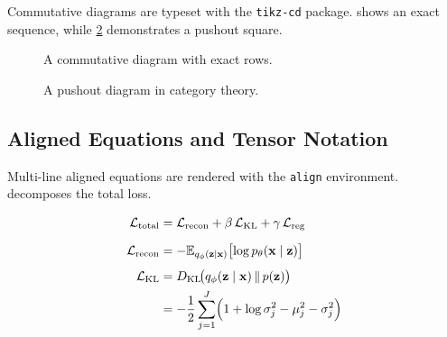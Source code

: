 \documentclass[
    language=english,
    doctype=article,
    institution=none,
    titlestyle=book,
]{../../omnilatex}
\theoremstyle{definition}
\theoremstyle{definition}
\theoremstyle{remark}
\newcommand{\mat}[1]{\mathbf{#1}}
\begin{document}
Commutative diagrams are typeset with the \texttt{tikz-cd} package.
 shows an exact sequence, while \cref{fig:cd-pushout}
demonstrates a pushout square.

\begin{figure}[htbp]
    \centering
    \caption{A commutative diagram with exact rows.}
    \label{fig:cd-exact}
\end{figure}

\begin{figure}[htbp]
    \centering
    \caption{A pushout diagram in category theory.}
    \label{fig:cd-pushout}
\end{figure}


\subsection{Aligned Equations and Tensor Notation}
\label{sec:aligned}

Multi-line aligned equations are rendered with the \texttt{align} environment.
 decomposes the total loss.

\begin{align}
    \label{eq:loss-decompose}
    \mathcal{L}_{\text{total}}
        &= \mathcal{L}_{\text{recon}} + \beta\, \mathcal{L}_{\text{KL}}
           + \gamma\, \mathcal{L}_{\text{reg}} \\[6pt]
    \mathcal{L}_{\text{recon}}
        &= -\mathbb{E}_{q_\phi(\mat{z} \mid \mat{x})}
           \bigl[\log p_\theta(\mat{x} \mid \mat{z})\bigr] \\[4pt]
    \mathcal{L}_{\text{KL}}
        &= D_{\mathrm{KL}}\!\bigl(
            q_\phi(\mat{z} \mid \mat{x})
            \,\|\,
            p(\mat{z})
           \bigr) \\
        &= -\frac{1}{2}\sum_{j=1}^{J}
           \Bigl(
               1 + \log \sigma_j^2 - \mu_j^2 - \sigma_j^2
           \Bigr)
\end{align}
\end{document}
